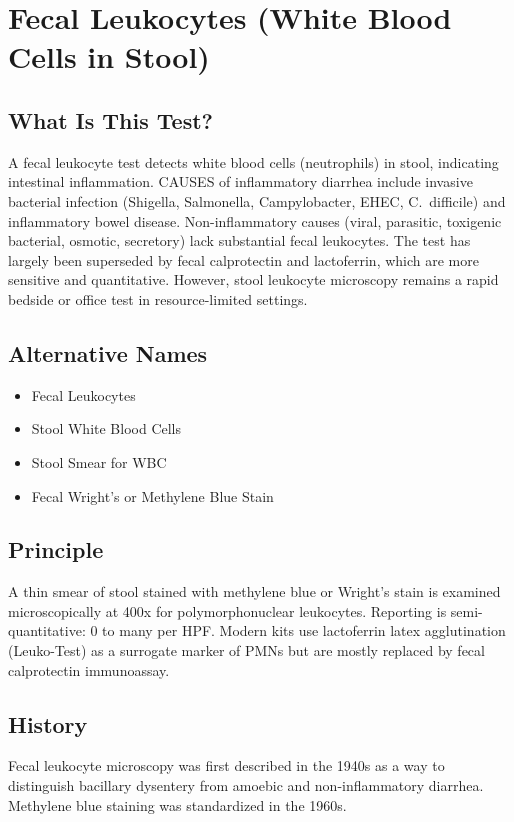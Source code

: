 \chapter{Fecal Leukocytes (White Blood Cells in Stool)}

\section*{What Is This Test?}
A fecal leukocyte test detects white blood cells (neutrophils) in stool, indicating intestinal inflammation. CAUSES of inflammatory diarrhea include invasive bacterial infection (Shigella, Salmonella, Campylobacter, EHEC, C.\ difficile) and inflammatory bowel disease. Non-inflammatory causes (viral, parasitic, toxigenic bacterial, osmotic, secretory) lack substantial fecal leukocytes. The test has largely been superseded by fecal calprotectin and lactoferrin, which are more sensitive and quantitative. However, stool leukocyte microscopy remains a rapid bedside or office test in resource-limited settings.

\section*{Alternative Names}
\begin{itemize}
  \item Fecal Leukocytes
  \item Stool White Blood Cells
  \item Stool Smear for WBC
  \item Fecal Wright's or Methylene Blue Stain
\end{itemize}
\section*{Principle}
A thin smear of stool stained with methylene blue or Wright's stain is examined microscopically at 400x for polymorphonuclear leukocytes. Reporting is semi-quantitative: 0 to many per HPF. Modern kits use lactoferrin latex agglutination (Leuko-Test) as a surrogate marker of PMNs but are mostly replaced by fecal calprotectin immunoassay.

\section*{History}
Fecal leukocyte microscopy was first described in the 1940s as a way to distinguish bacillary dysentery from amoebic and non-inflammatory diarrhea. Methylene blue staining was standardized in the 1960s.

